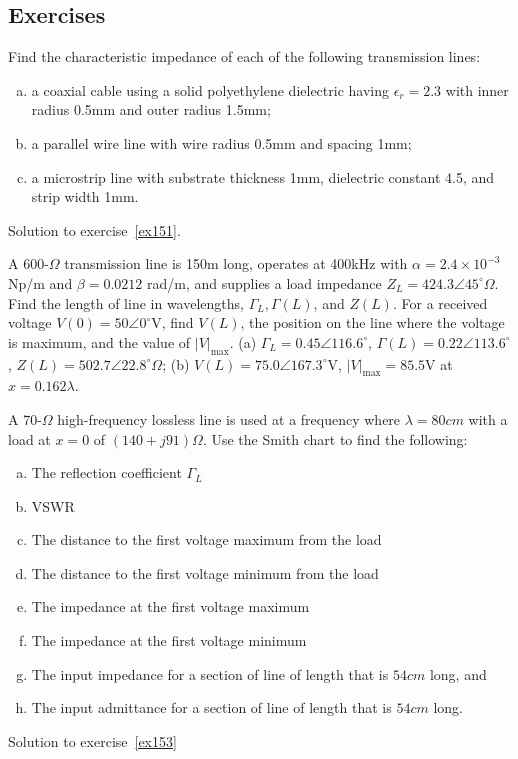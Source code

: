 \begin{mdframed}[ backgroundcolor=lightblue, linewidth=1pt, hidealllines=true]
\section{Exercises}
\begin{ExerciseList}

\Exercise[label={ex151}]
Find the characteristic impedance of each of the following transmission lines:
\begin{enumerate}[(a)]
\item a coaxial cable using a solid polyethylene dielectric having $\epsilon_r = 2.3$ with inner radius 0.5mm and outer radius 1.5mm; 
\item a parallel wire line with wire radius 0.5mm and spacing 1mm; 
\item a microstrip line with substrate thickness 1mm, dielectric constant 4.5, and strip width 1mm.
\end{enumerate}
\Answer[ref={ex151}]
Solution to exercise~\ref{ex151}.

\Exercise[label={ex152}]
A 600-$\varOmega$ transmission line is 150m long, operates at 400kHz with $\alpha = 2.4\times 10^{-3}$ Np/m and $\beta = 0.0212$ rad/m, and supplies a load impedance $Z_L = 424.3\angle45^{\circ}\varOmega$. Find the length of line in wavelengths, $\Gamma_L, \Gamma(L)$, and $Z(L)$. For a received voltage $V(0) = 50\angle0^{\circ}$V, find $V(L)$, the position on the line where the voltage is maximum, and the value of $|V|_\max$.
\Answer[ref={ex152}]
(a) $\Gamma_L = 0.45\angle116.6^{\circ}$, $\Gamma(L) = 0.22\angle113.6^{\circ}$, $Z(L) = 502.7\angle22.8^{\circ}\varOmega$; (b) $V(L) = 75.0\angle167.3^{\circ}$V, $|V|_\max = 85.5$V at $x = 0.162\lambda$.

\Exercise[label={ex153}]
A 70-$\varOmega$ high-frequency lossless line is used at a frequency where $\lambda = 80cm$ with a load at $x = 0$ of $(140 + j91)\varOmega$. Use the Smith chart to find the following:
\begin{enumerate}[(a)]
\item The reflection coefficient $\Gamma_L$ 
\item VSWR
\item The distance to the first voltage maximum from the load
\item The distance to the first voltage minimum from the load
\item The impedance at the first voltage maximum
\item The impedance at the first voltage minimum
\item The input impedance for a section of line of length that is $54cm$ long, and
\item The input admittance for a section of line of length that is $54cm$ long.
\end{enumerate}
\Answer[ref={ex153}]
Solution to exercise~\ref{ex153}

\end{ExerciseList}
\end{mdframed}
